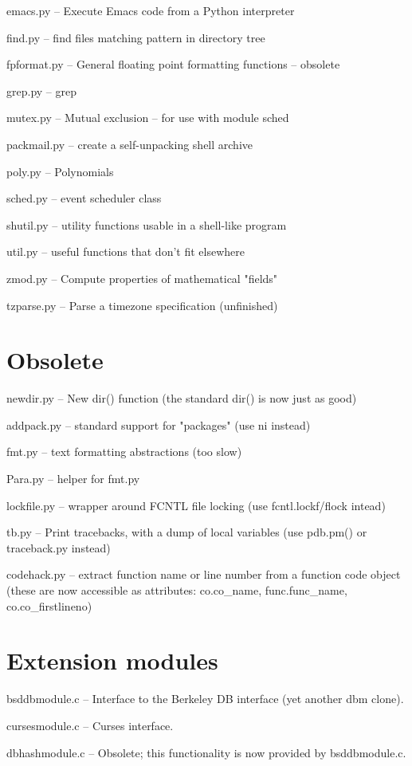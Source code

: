emacs.py -- Execute Emacs code from a Python interpreter

find.py -- find files matching pattern in directory tree

fpformat.py -- General floating point formatting functions -- obsolete

grep.py -- grep

mutex.py -- Mutual exclusion -- for use with module sched

packmail.py -- create a self-unpacking \UNIX{} shell archive

poly.py -- Polynomials

sched.py -- event scheduler class

shutil.py -- utility functions usable in a shell-like program

util.py -- useful functions that don't fit elsewhere

zmod.py -- Compute properties of mathematical "fields"

tzparse.py -- Parse a timezone specification (unfinished)


\section{Obsolete}

newdir.py -- New dir() function (the standard dir() is now just as good)

addpack.py -- standard support for "packages" (use ni instead)

fmt.py -- text formatting abstractions (too slow)

Para.py -- helper for fmt.py

lockfile.py -- wrapper around FCNTL file locking (use
fcntl.lockf/flock intead)

tb.py -- Print tracebacks, with a dump of local variables (use
pdb.pm() or traceback.py instead)

codehack.py -- extract function name or line number from a function
code object (these are now accessible as attributes: co.co_name,
func.func_name, co.co_firstlineno)


\section{Extension modules}

bsddbmodule.c -- Interface to the Berkeley DB interface (yet another
dbm clone).

cursesmodule.c -- Curses interface.

dbhashmodule.c -- Obsolete; this functionality is now provided by
bsddbmodule.c.

